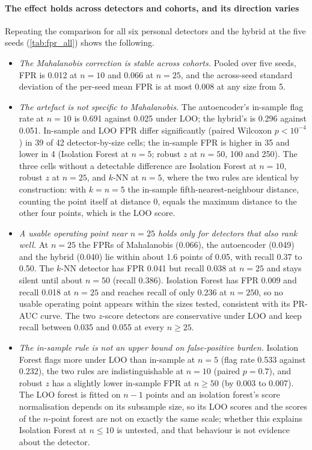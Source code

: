 \paragraph{The effect holds across detectors and cohorts, and its direction varies}
Repeating the comparison for all six personal detectors and the hybrid at the five seeds (\cref{tab:fpr_all}) shows the following.
\begin{itemize}
\item \emph{The Mahalanobis correction is stable across cohorts.} Pooled over five seeds, FPR is 0.012 at $n=10$ and 0.066 at $n=25$, and the across-seed standard deviation of the per-seed mean FPR is at most 0.008 at any size from 5.
\item \emph{The artefact is not specific to Mahalanobis.} The autoencoder's in-sample flag rate at $n=10$ is 0.691 against 0.025 under LOO; the hybrid's is 0.296 against 0.051. In-sample and LOO FPR differ significantly (paired Wilcoxon $p<10^{-4}$) in 39 of 42 detector-by-size cells; the in-sample FPR is higher in 35 and lower in 4 (Isolation Forest at $n=5$; robust $z$ at $n=50$, 100 and 250). The three cells without a detectable difference are Isolation Forest at $n=10$, robust $z$ at $n=25$, and $k$-NN at $n=5$, where the two rules are identical by construction: with $k=n=5$ the in-sample fifth-nearest-neighbour distance, counting the point itself at distance 0, equals the maximum distance to the other four points, which is the LOO score.
\item \emph{A usable operating point near $n=25$ holds only for detectors that also rank well.} At $n=25$ the FPRs of Mahalanobis (0.066), the autoencoder (0.049) and the hybrid (0.040) lie within about 1.6 points of 0.05, with recall 0.37 to 0.50. The $k$-NN detector has FPR 0.041 but recall 0.038 at $n=25$ and stays silent until about $n=50$ (recall 0.386). Isolation Forest has FPR 0.009 and recall 0.018 at $n=25$ and reaches recall of only 0.236 at $n=250$, so no usable operating point appears within the sizes tested, consistent with its PR-AUC curve. The two $z$-score detectors are conservative under LOO and keep recall between 0.035 and 0.055 at every $n\ge25$.
\item \emph{The in-sample rule is not an upper bound on false-positive burden.} Isolation Forest flags more under LOO than in-sample at $n=5$ (flag rate 0.533 against 0.232), the two rules are indistinguishable at $n=10$ (paired $p=0.7$), and robust $z$ has a slightly lower in-sample FPR at $n\ge50$ (by 0.003 to 0.007). The LOO forest is fitted on $n-1$ points and an isolation forest's score normalisation depends on its subsample size, so its LOO scores and the scores of the $n$-point forest are not on exactly the same scale; whether this explains Isolation Forest at $n\le10$ is untested, and that behaviour is not evidence about the detector.

\end{itemize}
